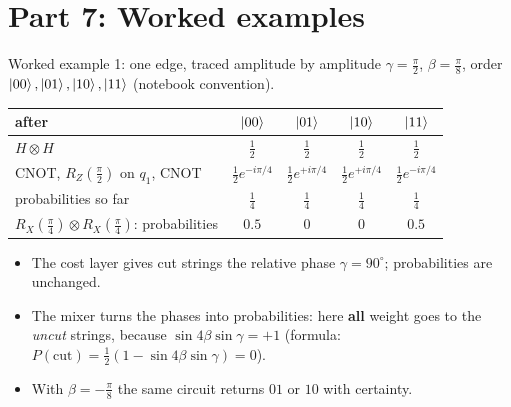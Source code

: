 \documentclass[aspectratio=169,11pt]{beamer}
\newcommand{\hl}[1]{{\color{qorange}\textbf{#1}}}
\begin{document}
\section{Part 7: Worked examples}
\begin{frame}{Worked example 1: one edge, traced amplitude by amplitude}
  \small
  $\gamma = \frac\pi2$, $\beta = \frac\pi8$, order $\ket{00}, \ket{01}, \ket{10}, \ket{11}$ (notebook convention).
  \begin{center}
  \begin{tabular}{lcccc}
    \toprule after & $\ket{00}$ & $\ket{01}$ & $\ket{10}$ & $\ket{11}$\\ \midrule
    $H\otimes H$ & $\frac12$ & $\frac12$ & $\frac12$ & $\frac12$\\
    CNOT, $R_Z(\frac\pi2)$ on $q_1$, CNOT & $\frac12e^{-i\pi/4}$ & $\frac12e^{+i\pi/4}$ & $\frac12e^{+i\pi/4}$ & $\frac12e^{-i\pi/4}$\\
    probabilities so far & $\frac14$ & $\frac14$ & $\frac14$ & $\frac14$\\
    $R_X(\frac\pi4)\otimes R_X(\frac\pi4)$: probabilities & $0.5$ & $0$ & $0$ & $0.5$\\ \bottomrule
  \end{tabular}
  \end{center}
  \begin{itemize}
    \item The cost layer gives cut strings the relative phase $\gamma = 90^\circ$; probabilities are unchanged.
    \item The mixer turns the phases into probabilities: here \hl{all} weight goes to the \emph{uncut} strings, because
      $\sin4\beta\sin\gamma = +1$ (formula: $P(\text{cut}) = \frac12(1 - \sin4\beta\sin\gamma) = 0$).
    \item With $\beta = -\frac\pi8$ the same circuit returns $01$ or $10$ with certainty.
  \end{itemize}
\end{frame}
\end{document}
